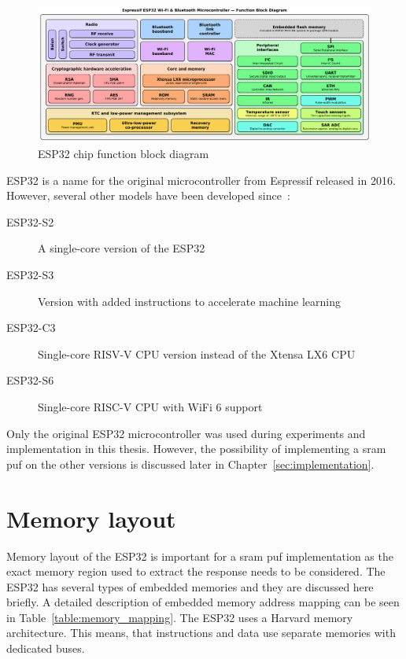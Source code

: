 \begin{figure}[ht!]
    \centering
    \captionsetup{justification=centering,margin=0.5cm}
    \includegraphics[width=\textwidth]{images/esp32_diagram.pdf}
    \caption[ESP32 chip function block diagram]{ESP32 chip function block diagram~\cite{Krent2018}}
    \label{fig:esp32_diagram}
\end{figure}

ESP32 is a name for the original microcontroller from Espressif released in 2016. However, several other models have been developed since~\cite{espidf2022}:

\begin{description}
    \item[ESP32-S2] A single-core version of the ESP32
    \item[ESP32-S3] Version with added instructions to accelerate machine learning
    \item[ESP32-C3] Single-core RISV-V CPU version instead of the Xtensa LX6 CPU
    \item[ESP32-S6] Single-core RISC-V CPU with WiFi 6 support
\end{description}

Only the original ESP32 microcontroller was used during experiments and implementation in this thesis. However, the possibility of implementing a \gls{sram} \gls{puf} on the other versions is discussed later in Chapter~\ref{sec:implementation}.

\section{Memory layout}\label{sec:memory_layout}

Memory layout of the ESP32 is important for a \gls{sram} \gls{puf} implementation as the exact memory region used to extract the response needs to be considered. The ESP32 has several types of embedded memories and they are discussed here briefly. A detailed description of embedded memory address mapping can be seen in Table~\ref{table:memory_mapping}. The ESP32 uses a Harvard memory architecture. This means, that instructions and data use separate memories with dedicated buses.~\cite{esp322021}

